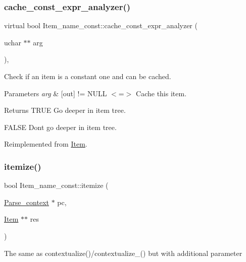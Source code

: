 \subsubsection{\texorpdfstring{cache\+\_\+const\+\_\+expr\+\_\+analyzer()}{cache\_const\_expr\_analyzer()}}
{\footnotesize\ttfamily virtual bool Item\+\_\+name\+\_\+const\+::cache\+\_\+const\+\_\+expr\+\_\+analyzer (\begin{DoxyParamCaption}\item[{uchar $\ast$$\ast$}]{arg }\end{DoxyParamCaption})\hspace{0.3cm}{\ttfamily [inline]}, {\ttfamily [virtual]}}

Check if an item is a constant one and can be cached.


\begin{DoxyParams}{Parameters}
{\em arg} & \mbox{[}out\mbox{]} != N\+U\+LL $<$=$>$ Cache this item.\\
\hline
\end{DoxyParams}
\begin{DoxyReturn}{Returns}
T\+R\+UE Go deeper in item tree. 

F\+A\+L\+SE Don\textquotesingle{}t go deeper in item tree. 
\end{DoxyReturn}


Reimplemented from \mbox{\hyperlink{classItem_a1957a7092839e6913cc8c6ed901c7bea}{Item}}.

\mbox{\label{classItem__name__const_ae8394eda20cb84282f9f6ea43fb6eacd}} 
\subsubsection{\texorpdfstring{itemize()}{itemize()}}
{\footnotesize\ttfamily bool Item\+\_\+name\+\_\+const\+::itemize (\begin{DoxyParamCaption}\item[{\mbox{\hyperlink{structParse__context}{Parse\+\_\+context}} $\ast$}]{pc,  }\item[{\mbox{\hyperlink{classItem}{Item}} $\ast$$\ast$}]{res }\end{DoxyParamCaption})\hspace{0.3cm}{\ttfamily [virtual]}}

The same as contextualize()/contextualize\+\_\+() but with additional parameter

